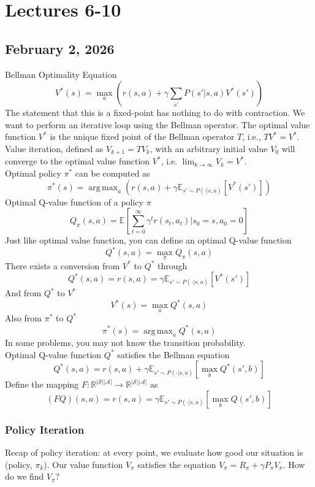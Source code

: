 \documentclass[oneside, 11pt, letterpaper]{book}
\newcommand{\R}{\mathbb{R}}
\newcommand{\E}{\mathbb{E}}
\DeclareMathOperator*{\argmax}{arg\,max}
\begin{document}
\chapter{Lectures 6-10}
\section{February 2, 2026}
Bellman Optimality Equation 
\[ 
  V^*(s) = \max_{a} \left( r(s, a) + \gamma \sum_{s'} P(s' | s,a) V^*(s') \right)
\] 
The statement that this is a fixed-point has nothing to do with contraction. We want to perform an iterative loop using the Bellman operator. The optimal value function $V^*$ is the unique fixed point of the Bellman operator $T$, i.e., $TV^* = V^*$. Value iteration, defined as $V_{k+1}=TV_k$, with an arbitrary initial value $V_0$ will converge to the optimal value function $V^*$, i.e. $\lim_{k\to\infty} V_k = V^*$.  \\ 

Optimal policy $\pi^*$ can be computed as 
\[ 
  \pi^*(s) = \argmax_{a} (r(s,a) + \gamma \E_{s'\sim P(\cdot | s,a)}[V^*(s')])
\]
Optimal Q-value function of a policy $\pi$
\[
  Q_\pi(s,a) = \E [\sum_{t=0}^{\infty} \gamma^t r(s_t, a_t) | s_0 = s, a_0 = 0]
\]
Just like optimal value function, you can define an optimal Q-value function 
\[
  Q^* (s, a) = \max_{\pi} Q_\pi (s,a)
\]
There exists a conversion from $V^*$ to $Q^*$ through
\[
  Q^*(s,a) = r(s,a) = \gamma \E_{s'\sim P(\cdot | s,a)} [V^*(s')]
\]
And from $Q^*$ to $V^*$
\[
  V^*(s) = \max_{a}Q^* (s, a)
\] 
Also from $\pi^*$ to $Q^*$
\[
  \pi^*(s) = \argmax_{a} Q^*(s, a)
\]
In some problems, you may not know the transition probability. \\ 

Optimal Q-value function $Q^*$ satisfies the Bellman equation 
\[
  Q^*(s, a) = r(s,a) + \gamma \E_{s'\sim P(\cdot| s,a)} [\max_{b} Q^*(s',b)]
\]
Define the mapping $F: \R^{|\mathcal{S}||\mathcal{A}|} \to \R^{|\mathcal{S}||\mathcal{A}|}$ as 
\[
  (FQ)(s, a) = r(s,a) = \gamma \E_{s'\sim P(\cdot | s,a)} [\max_{b} Q(s', b)]
\]
\subsection{Policy Iteration}

Recap of policy iteration: at every point, we evaluate how good our situation is (policy, $\pi_k$). Our value function $V_\pi$ satisfies the equation $V_\pi = R_\pi + \gamma P_\pi V_\pi$. How do we find $V_\pi$? \\ 
\end{document}
